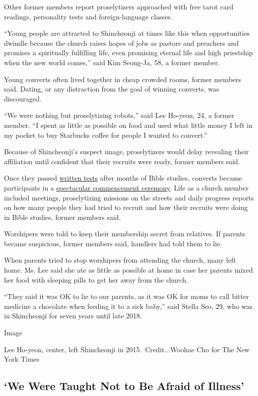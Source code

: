 Other former members report proselytizers approached with free tarot
card readings, personality tests and foreign-language classes.

``Young people are attracted to Shincheonji at times like this when
opportunities dwindle because the church raises hopes of jobs as pastors
and preachers and promises a spiritually fulfilling life, even promising
eternal life and high priestship when the new world comes,'' said Kim
Seong-Ja, 58, a former member.

Young converts often lived together in cheap crowded rooms, former
members said. Dating, or any distraction from the goal of winning
converts, was discouraged.

``We were nothing but proselytizing robots,'' said Lee Ho-yeon, 24, a
former member. ``I spent as little as possible on food and used what
little money I left in my pocket to buy Starbucks coffee for people I
wanted to convert.''

Because of Shincheonji's suspect image, proselytizers would delay
revealing their affiliation until confident that their recruits were
ready, former members said.

Once they ​passed
\href{https://www.youtube.com/watch?v=CUgv5BZ3FQo}{written tests} after
months of Bible studies, converts ​became participants in a
\href{https://www.youtube.com/watch?v=wHHijQhjseY}{spectacular
commencement ceremony}. Life as a church member included meetings,
proselytizing missions on the streets and daily progress reports on how
many people they had tried to recruit and how their recruits were doing
in Bible studies, former members said.

Worshipers were told to keep their membership secret from relatives. If
parents became suspicious, former members said, handlers had told them
to lie.

When parents tried to stop worshipers from attending the church, many
left home. Ms. Lee said she ate as little as possible at home in case
her parents mixed her food with sleeping pills to get her away from the
church.

``They said it was OK to lie to our parents, as it was OK for moms to
call bitter medicine a chocolate when feeding it to a sick baby,'' said
Stella Seo, 29, who was in Shincheonji for seven years until late 2018.

Image

Lee Ho-yeon, center, left Shincheonji in 2015.~Credit...Woohae Cho for
The New York Times

\hypertarget{we-were-taught-not-to-be-afraid-of-illness}{%
\subsection{`We Were Taught Not to Be Afraid of
Illness'}\label{we-were-taught-not-to-be-afraid-of-illness}}

